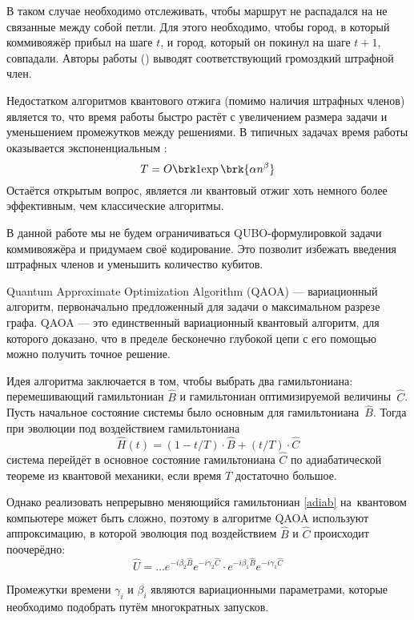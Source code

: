 В таком случае необходимо отслеживать, чтобы маршрут не распадался на не связанные между собой петли.
Для этого необходимо, чтобы город, в который коммивояжёр прибыл на шаге $t$, и город, который он покинул на шаге $t+1$, совпадали. Авторы работы \cite{QUBO-TSP} (\citeyear{QUBO-TSP}) выводят соответствующий громоздкий штрафной член.

Недостатком алгоритмов квантового отжига (помимо наличия штрафных членов) является то, что время работы быстро растёт с увеличением размера задачи и уменьшением промежутков между решениями. В типичных задачах время работы оказывается экспоненциальным \cite{allQUBOs}:
$$
T = O\brk1{\exp\brk{\alpha n ^ \beta}}
$$
Остаётся открытым вопрос, является ли квантовый отжиг хоть немного более эффективным, чем классические алгоритмы.

В данной работе мы не будем ограничиваться QUBO-формулировкой задачи коммивояжёра и придумаем своё кодирование. Это позволит избежать введения штрафных членов и уменьшить количество кубитов.


Quantum Approximate Optimization Algorithm (QAOA) \cite{QAOA} --- вариационный алгоритм, первоначально предложенный для задачи о максимальном разрезе графа. QAOA --- это единственный вариационный квантовый алгоритм, для которого доказано, что в пределе бесконечно глубокой цепи с его помощью можно получить точное решение.

Идея алгоритма заключается в том, чтобы выбрать два гамильтониана: перемешивающий гамильтониан $\hat B$ и гамильтониан оптимизируемой величины~$\hat C$. Пусть начальное состояние системы было основным для гамильтониана~$\hat B$. Тогда при эволюции под воздействием гамильтониана
\begin{equation}
\hat H(t) = (1-t/T) \cdot \hat B + (t/T) \cdot \hat C
\label{adiab}
\end{equation}
система перейдёт в основное состояние гамильтониана $\hat C$ по адиабатической теореме из квантовой механики, если время $T$ достаточно большое.

Однако реализовать непрерывно меняющийся гамильтониан \eqref{adiab} на~квантовом компьютере может быть сложно, поэтому в алгоритме QAOA используют аппроксимацию, в которой эволюция под воздействием $\hat B$ и $\hat C$ происходит поочерёдно:
$$
\hat U = \dots e^{-i \beta_2 \hat B} e^{-i \gamma_2 \hat C} \cdot e^{-i \beta_1 \hat B} e^{-i \gamma_1 \hat C}
$$

Промежутки времени $\gamma_i$ и $\beta_i$ являются вариационными параметрами, которые необходимо подобрать путём многократных запусков.

